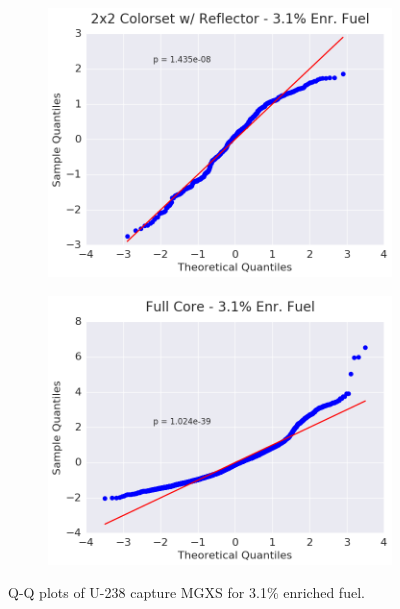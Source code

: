 \begin{figure}[h!]
\begin{subfigure}{0.5\textwidth}
  \includegraphics[width=\linewidth]{figures/patterns/reflector/quantile/31-enr-capt-1}  \caption{}
  \label{fig:chap9-qq-reflector-3.1-capt}
\end{subfigure}%
\begin{subfigure}{0.5\textwidth}
  \centering
  \includegraphics[width=\linewidth]{figures/patterns/full-core/quantile/31-enr-capt-1} \caption{}
  \label{fig:chap9-qq-full-core-3.1-capt}
\end{subfigure}
\caption[Q-Q plots of U-238 capture MGXS for 3.1\% enriched fuel]{Q-Q plots of U-238 capture \ac{MGXS} for 3.1\% enriched fuel.}
\label{fig:chap9-qq-3.1-capt}
\end{figure}

